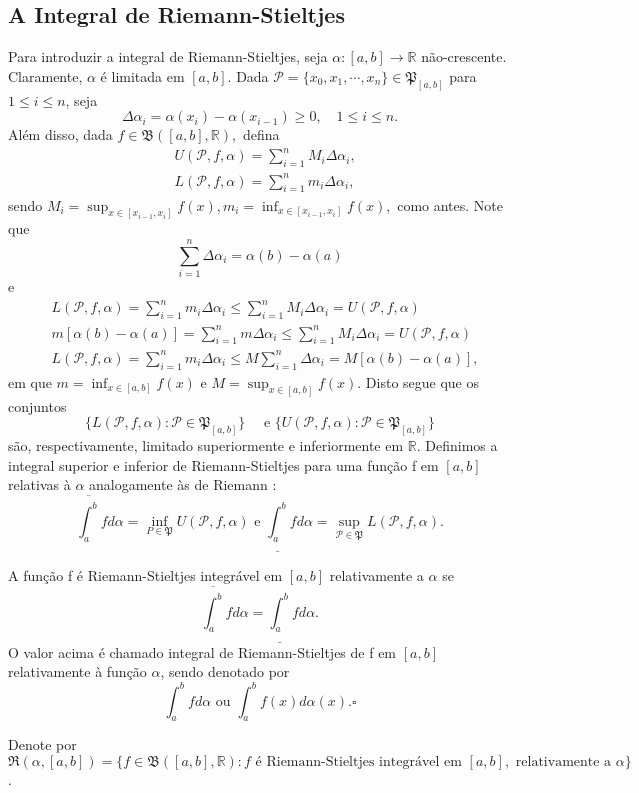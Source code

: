\documentclass[analysis_notes.tex]{subfiles}
\begin{document}
\subsection{A Integral de Riemann-Stieltjes}
Para introduzir a integral de Riemann-Stieltjes, seja \(\alpha :[a, b]\rightarrow \mathbb{R}\) não-crescente. Claramente, \(\alpha \) é limitada em \([a, b]\).
Dada \(\mathcal{P}=\{x_{0}, x_{1}, \cdots, x_{n}\}\in \mathfrak{P}_{[a, b]}\) para \(1\leq i\leq n\), seja
\[
	\Delta \alpha_{i} = \alpha (x_{i}) - \alpha (x_{i-1})\geq 0,\quad 1\leq i\leq n.
\]
Além disso, dada \(f\in \mathfrak{B}([a, b], \mathbb{R}),\) defina
\begin{align*}
	 & U(\mathcal{P}, f, \alpha ) = \sum\limits_{i=1}^{n}M_{i}\Delta \alpha_{i}, \\
	 & L(\mathcal{P}, f, \alpha ) = \sum\limits_{i=1}^{n}m_{i}\Delta \alpha_{i},
\end{align*}
sendo \(M_{i} = \sup_{x\in[x_{i-1}, x_{i}]}f(x), m_{i} = \inf_{x\in[x_{i-1}, x_{i}]}f(x),\) como antes.
Note que
\[
	\sum\limits_{i=1}^{n}\Delta \alpha_{i} = \alpha (b) - \alpha (a)
\]
e
\begin{align*}
	 & L(\mathcal{P}, f, \alpha ) = \sum\limits_{i=1}^{n}m_{i}\Delta \alpha_{i}\leq \sum\limits_{i=1}^{n}M_{i}\Delta \alpha_{i} = U(\mathcal{P}, f, \alpha ) \\
	 & m[\alpha (b) - \alpha (a)] = \sum\limits_{i=1}^{n}m\Delta \alpha_{i}\leq \sum\limits_{i=1}^{n}M_{i}\Delta \alpha_{i} = U(\mathcal{P}, f, \alpha )     \\
	 & L(\mathcal{P}, f, \alpha ) = \sum\limits_{i=1}^{n}m_{i}\Delta \alpha_{i}\leq M \sum\limits_{i=1}^{n}\Delta \alpha_{i} = M[\alpha (b)-\alpha (a)],
\end{align*}
em que \(m = \inf_{x\in[a,b]}f(x)\) e \(M=\sup_{x\in[a, b]}f(x).\) Disto segue que os conjuntos
\[
	\{L(\mathcal{P}, f, \alpha ): \mathcal{P}\in \mathfrak{P}_{[a, b]}\}\quad\text{ e } \{U(\mathcal{P}, f, \alpha ): \mathcal{P}\in \mathfrak{P}_{[a, b]}\}
\]
são, respectivamente, limitado superiormente e inferiormente em \(\mathbb{R}.\) Definimos a integral superior
e inferior de Riemann-Stieltjes para uma fun\c cão f em \([a, b]\) relativas à \(\alpha \) analogamente às de Riemann :
\[
	\overline{\int_{a}^{b}}f d\alpha =\inf_{P\in \mathfrak{P}}U(\mathcal{P}, f, \alpha ) \text{ e } \underline{\int_{a}^{b}}f d\alpha =\sup_{\mathcal{P}\in \mathfrak{P}}L(\mathcal{P}, f, \alpha ).
\]
\begin{def*}
	A fun\c cão f é Riemann-Stieltjes integrável em \([a, b]\) relativamente a \(\alpha \) se
	\[
		\overline{\int_{a}^{b}}f d\alpha  = \underline{\int_{a}^{b}}fd\alpha .
	\]
	O valor acima é chamado integral de Riemann-Stieltjes de f em \([a, b]\) relativamente à fun\c cão \(\alpha \), sendo denotado por
	\[
		\int_{a}^{b} f d\alpha \text{ ou } \int_{a}^{b} f(x) d\alpha (x). \square
	\]
\end{def*}
Denote por \(\mathfrak{R}(\alpha , [a, b]) = \{f\in \mathfrak{B}([a, b], \mathbb{R}): f\text{ é Riemann-Stieltjes integrável em }[a, b],\text{ relativamente a }\alpha \}\).
\end{document}

